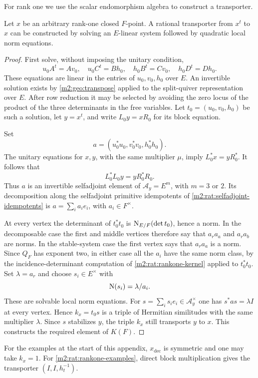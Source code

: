 For rank one we use the scalar endomorphism algebra to construct
a transporter.

\begin{proposition}\label{m2:rat:rankone-transporter}
Let $x$ be an arbitrary rank-one closed $F$-point.
A rational transporter from $x^t$ to $x$ can be
constructed by solving an $E$-linear system followed
by quadratic local norm equations.
\end{proposition}

\begin{proof}
First solve, without imposing the unitary condition,
\begin{equation}\label{m2:rat:linear-transporter}
 u_0A^t=Av_0,\quad u_0C^t=Bh_0,\quad
 h_0B^t=Cv_0,\quad h_0D^t=Dh_0.
\end{equation}
These equations are linear in the entries of
$u_0,v_0,h_0$ over $E$.  An invertible solution exists
by \cref{m2:geo:transpose} applied to the split-quiver
representation over $E$.  After row reduction it may
be selected by avoiding the zero locus of the product
of the three determinants in the free variables.
Let $t_0=(u_0,v_0,h_0)$ be such a solution, let
$y=x^t$, and write $L_0y=xR_0$ for its block equation.

Set
\[
 a=(u_0^*u_0,v_0^*v_0,h_0^*h_0).
\]
The unitary equations for $x,y$, with the same
multiplier $\mu$, imply $L_0^*x=yR_0^*$.
It follows that
\[
 L_0^*L_0y=yR_0^*R_0.
\]
Thus $a$ is an invertible selfadjoint element of
$\mathscr A_y=E^m$, with $m=3$ or $2$.
Its decomposition along the selfadjoint primitive idempotents
of \cref{m2:rat:selfadjoint-idempotents} is
$a=\sum_i a_ie_i$, with $a_i\in F^\times$.

At every vertex the determinant of $t_0^*t_0$ is
$\operatorname{N}_{E/F}(\det t_0)$, hence a norm.  In the
decomposable case the first and middle vertices
therefore say that $a_ra_a$ and $a_ra_b$ are norms.
In the stable-system case the first vertex says
that $a_ra_a$ is a norm.  Since $Q_F$ has exponent
two, in either case all the $a_i$ have the same
norm class, by the incidence-determinant computation of
\cref{m2:rat:rankone-kernel} applied to $t_0^*t_0$.
Set $\lambda=a_r$ and choose
$s_i\in E^\times$ with
\[
 \operatorname{N}(s_i)=\lambda/a_i.
\]
These are solvable local norm equations.  For
$s=\sum_i s_ie_i\in\mathscr A_y^\times$ one has
$s^*as=\lambda I$ at every vertex.  Hence
$k_x=t_0s$ is a triple of Hermitian similitudes
with the same multiplier $\lambda$.  Since $s$
stabilizes $y$, the triple $k_x$ still transports
$y$ to $x$.  This constructs the required element
of $K(F)$.
\end{proof}

For the examples at the start of this appendix, $x_{\mathrm{dec}}$ is
symmetric and one may take $k_x=1$.  For
\eqref{m2:rat:rankone-examples}, direct block
multiplication gives the transporter
$(I,I,h_t^{-1})$.


